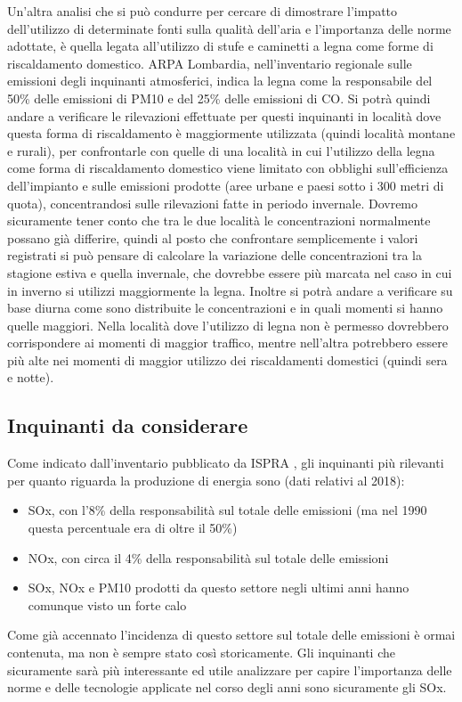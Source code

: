 \documentclass{article}
\begin{document}
Un'altra analisi che si può condurre per cercare di dimostrare l'impatto dell'utilizzo di determinate fonti sulla qualità dell'aria e l'importanza delle norme adottate, è quella legata all'utilizzo di stufe e caminetti a legna come forme di riscaldamento domestico. ARPA Lombardia, nell'inventario regionale sulle emissioni degli inquinanti atmosferici\cite{inemar2017}, indica la legna come la responsabile del 50\% delle emissioni di PM10 e del 25\% delle emissioni di CO. Si potrà quindi andare a verificare le rilevazioni effettuate per questi inquinanti in località dove questa forma di riscaldamento è maggiormente utilizzata (quindi località montane e rurali), per confrontarle con quelle di una località in cui l'utilizzo della legna come forma di riscaldamento domestico viene limitato con obblighi sull'efficienza dell'impianto e sulle emissioni prodotte (aree urbane e paesi sotto i 300 metri di quota), concentrandosi sulle rilevazioni fatte in periodo invernale. Dovremo sicuramente tener conto che tra le due località le concentrazioni normalmente possano già differire, quindi al posto che confrontare semplicemente i valori registrati si può pensare di calcolare la variazione delle concentrazioni tra la stagione estiva e quella invernale, che dovrebbe essere più marcata nel caso in cui in inverno si utilizzi maggiormente la legna. Inoltre si potrà andare a verificare su base diurna come sono distribuite le concentrazioni e in quali momenti si hanno quelle maggiori. Nella località dove l'utilizzo di legna non è permesso dovrebbero corrispondere ai momenti di maggior traffico, mentre nell'altra potrebbero essere più alte nei momenti di maggior utilizzo dei riscaldamenti domestici (quindi sera e notte).

\subsection{Inquinanti da considerare}
Come indicato dall'inventario pubblicato da ISPRA \cite{iir2020}, gli inquinanti più rilevanti per quanto riguarda la produzione di energia sono (dati relativi al 2018): 
\begin{itemize}
	\item SOx, con l'8\% della responsabilità sul totale delle emissioni (ma nel 1990 questa percentuale era di oltre il 50\%)
	\item NOx, con circa il 4\% della responsabilità sul totale delle emissioni
	\item SOx, NOx e PM10 prodotti da questo settore negli ultimi anni hanno comunque visto un forte calo
\end{itemize}
Come già accennato l'incidenza di questo settore sul totale delle emissioni è ormai contenuta, ma non è sempre stato così storicamente. Gli inquinanti che sicuramente sarà più interessante ed utile analizzare per capire l'importanza delle norme e delle tecnologie applicate nel corso degli anni sono sicuramente gli SOx.
\end{document}
